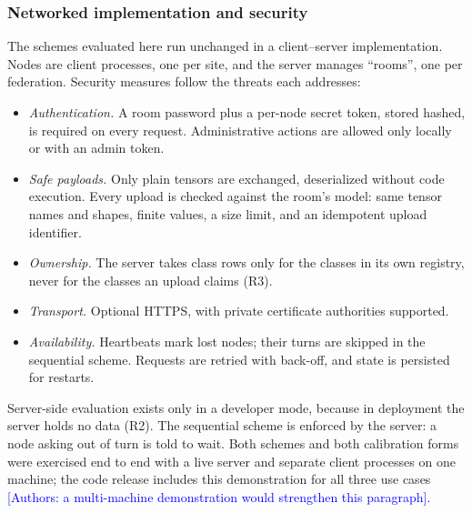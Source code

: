 \documentclass[pdflatex,sn-mathphys-num]{sn-jnl}
\newcommand{\authornote}[1]{\textcolor{blue}{[Authors: #1]}}
\begin{document}
\subsubsection{Networked implementation and security}\label{sec:net}
The schemes evaluated here run unchanged in a client--server implementation. Nodes are client processes, one per site, and the server manages ``rooms'', one per federation. Security measures follow the threats each addresses:
\begin{itemize}
\item \emph{Authentication.} A room password plus a per-node secret token, stored hashed, is required on every request. Administrative actions are allowed only locally or with an admin token.
\item \emph{Safe payloads.} Only plain tensors are exchanged, deserialized without code execution. Every upload is checked against the room's model: same tensor names and shapes, finite values, a size limit, and an idempotent upload identifier.
\item \emph{Ownership.} The server takes class rows only for the classes in its own registry, never for the classes an upload claims (R3).
\item \emph{Transport.} Optional HTTPS, with private certificate authorities supported.
\item \emph{Availability.} Heartbeats mark lost nodes; their turns are skipped in the sequential scheme. Requests are retried with back-off, and state is persisted for restarts.
\end{itemize}
Server-side evaluation exists only in a developer mode, because in deployment the server holds no data (R2). The sequential scheme is enforced by the server: a node asking out of turn is told to wait. Both schemes and both calibration forms were exercised end to end with a live server and separate client processes on one machine; the code release includes this demonstration for all three use cases \authornote{a multi-machine demonstration would strengthen this paragraph}.
\end{document}
